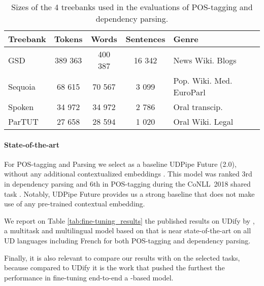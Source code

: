 \begin{table}
    \centering
    \begin{tabular}{lcccl}
        \toprule
        Treebank & Tokens  & Words   & Sentences & Genre                    \\
        \midrule
        GSD      & 389 363 & 400 387 & 16 342    & News Wiki. Blogs         \\
        Sequoia  & 68 615  & 70 567  & 3 099     & Pop. Wiki. Med. EuroParl \\
        Spoken   & 34 972  & 34 972  & 2 786     & Oral transcip.           \\
        ParTUT   & 27 658  & 28 594  & 1 020     & Oral Wiki. Legal         \\
        \bottomrule
    \end{tabular}
    \caption{Sizes of the 4 treebanks used in the evaluations of POS-tagging and dependency parsing. \label{treebanks-tab-cabernet}}
\end{table}

\paragraph{State-of-the-art}

For POS-tagging and Parsing we select as a baseline UDPipe Future (2.0), without any additional contextualized embeddings \citep{straka-2018-udpipe}. This model was ranked 3rd in dependency parsing and 6th in POS-tagging during the CoNLL~2018 shared task \citep{seker-etal-2018-universal}. Notably, UDPipe Future provides us a strong baseline that does not make use of any pre-trained contextual embedding.

We report on Table \ref{tab:fine-tuning_results} the published results on UDify by \citep{kondratyuk-straka-2019-75}, a multitask and multilingual model based on \mbert that is near state-of-the-art on all UD languages including French for both POS-tagging and dependency parsing.



Finally, it is also relevant to compare our results with \camembert on the selected tasks, because compared to UDify it is the work that pushed the furthest the performance in fine-tuning end-to-end a \bert-based model.

